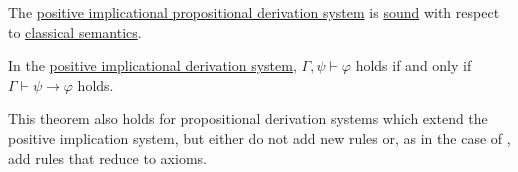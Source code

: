 \begin{proposition}\label{thm:soundness_of_positive_implicational_propositional_derivation_system}
  The \hyperref[def:positive_implicational_propositional_derivation_system]{positive implicational propositional derivation system} is \hyperref[def:derivability_and_satisfiability/soundness]{sound} with respect to \hyperref[def:propositional_semantics]{classical semantics}.
\end{proposition}

\begin{theorem}\label{thm:propositional_syntactic_deduction_theorem}
  In the \hyperref[def:positive_implicational_propositional_derivation_system]{positive implicational derivation system}, \( \Gamma, \psi \vdash \varphi \) holds if and only if \( \Gamma \vdash \psi \rightarrow \varphi \) holds.

  This theorem also holds for propositional derivation systems which extend the positive implication system, but either do not add new rules or, as in the case of , add rules that reduce to axioms.
\end{theorem}
